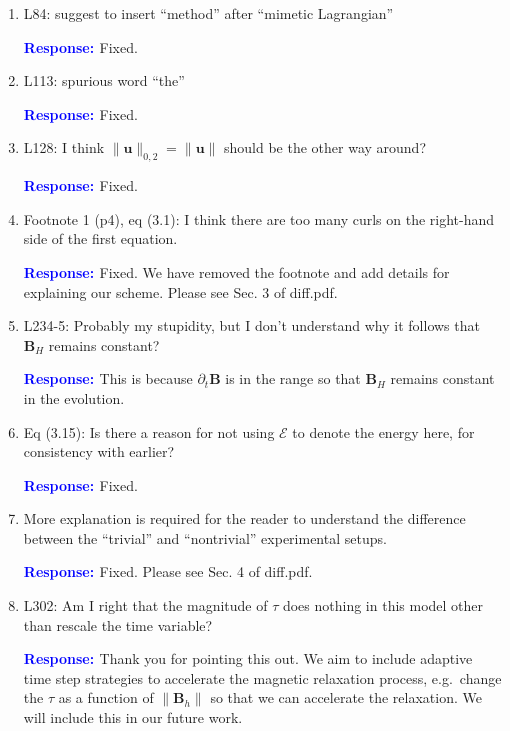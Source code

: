 \documentclass{article}
\theoremstyle{definition}
\newcommand{\rv}[1]{%
  \colorbox{gray!20}{%
    \parbox{0.96\linewidth}{%
      \small #1
    }%
  }%
}
\newcommand{\rp}{\textbf{\textcolor{blue}{Response: }}}
\newcommand{\blue}[1]{\textcolor{blue}{#1}}
\begin{document}
\begin{enumerate}
\rp Fixed. We add the force-free equilibrium for the description of the Parker conjecture: \blue{\emph{For almost all possible boundary flows the magnetic field develops tangential discontinuities during relaxation to a force-free equilibrium.}}

\item \rv{L84: suggest to insert “method” after “mimetic Lagrangian”}

\rp Fixed. 

\item \rv{L113: spurious word “the”}

\rp Fixed.

\item \rv{L128: I think $\|\bm u\|_{0, 2} = \|\bm u\|$ should be the other way around?}

\rp Fixed.

\item \rv{Footnote 1 (p4), eq (3.1): I think there are too many curls on the right-hand side of the
first equation.}

\rp Fixed. We have removed the footnote and add details for explaining our scheme. Please see Sec. 3 of diff.pdf. 

\item \rv{L234-5: Probably my stupidity, but I don’t understand why it follows that $\bm B_H$ remains
constant?}

\rp This is because $\partial_t \bm B$ is in the range so that $\bm B_H$ remains constant in the evolution.

\item \rv{Eq (3.15): Is there a reason for not using $\mathcal{E}$ to denote the energy here, for consistency with
earlier?}

\rp Fixed. 

\item \rv{More explanation is required for the reader to understand the diﬀerence between
the “trivial” and “nontrivial” experimental setups.}

\rp Fixed. Please see Sec. 4 of diff.pdf. 

\item \rv{L302: Am I right that the magnitude of $\tau$ does nothing in this model other than rescale
the time variable?}

\rp Thank you for pointing this out. We aim to include adaptive time step strategies to accelerate the magnetic relaxation process, e.g.~change the $\tau$ as a function of $\|\bm B_h\|$ so that we can accelerate the relaxation. We will include this in our future work. 


\end{enumerate}
\end{document}
